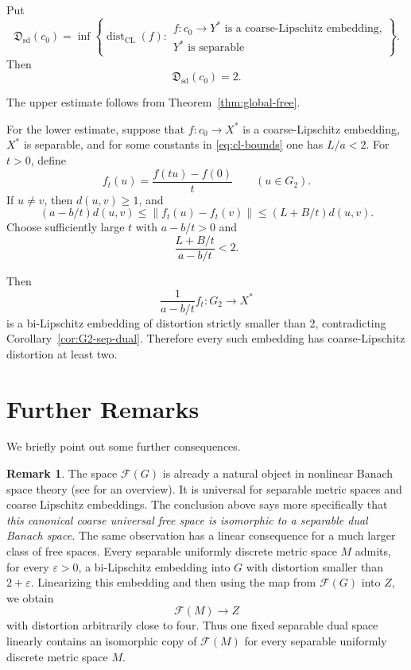 \documentclass[11pt]{amsart}
\theoremstyle{definition}
\newtheorem{remark}[theorem]{Remark}
\newcommand{\F}{\mathcal F}
\newcommand{\dist}{\operatorname{dist}}
\newcommand{\norm}[1]{\lVert#1\rVert}
\begin{document}
Put
$$
\mathfrak D_{\mathrm{sd}}(c_0)
=\inf\left\{\dist_{\mathrm{CL}}(f):
\begin{array}{c}
f:c_0\to Y^*\text{ is a coarse-Lipschitz embedding,}\\
Y^*\text{ is separable}
\end{array}
\right\}.
$$
Then
$$
       \mathfrak D_{\mathrm{sd}}(c_0)=2.
$$

The upper estimate follows from Theorem~\ref{thm:global-free}.

For the lower estimate, suppose that $f:c_0\to X^*$ is a coarse-Lipschitz
embedding, $X^*$ is separable, and for some constants in
\eqref{eq:cl-bounds} one has $L/a<2$.  For $t>0$, define
$$
       f_t(u)=\frac{f(tu)-f(0)}{t}
       \qquad(u\in G_2).
$$
If $u\neq v$, then $d(u,v)\geq1$, and
$$
 (a-b/t)d(u,v)
 \leq\norm{f_t(u)-f_t(v)}
 \leq(L+B/t)d(u,v).
$$
Choose sufficiently large $t$ with $a-b/t>0$ and
$$
       \frac{L+B/t}{a-b/t}<2.
$$

Then 
$$
\frac{1}{a-b/t}f_t:G_2\to X^*
$$
is a bi-Lipschitz embedding of distortion strictly smaller than 2, contradicting
Corollary~\ref{cor:G2-sep-dual}.  Therefore every such embedding has
coarse-Lipschitz distortion at least two.



\section{Further Remarks} We briefly point out some further consequences.

\begin{remark}\label{cor:uniformly-discrete-free} The space $\F(G)$ is already a natural object in nonlinear Banach space theory (see \cite[Section 4.5]{BL} for an overview). It is universal for separable metric spaces and coarse Lipschitz embeddings. The conclusion above says more specifically that {\em this canonical coarse universal free space is isomorphic to a separable dual Banach space.} The same observation has a linear consequence for a much larger class of free spaces. Every separable uniformly discrete metric space $M$ admits, for every $\varepsilon>0$, a bi-Lipschitz embedding into $G$ with distortion smaller than $2+\varepsilon$. Linearizing this embedding and then using the map from $\F(G)$ into $Z$, we obtain \[ \F(M)\longrightarrow Z \] with distortion arbitrarily close to four. Thus one fixed separable dual space linearly contains an isomorphic copy of $\F(M)$ for every separable uniformly discrete metric space $M$. 
\end{remark}
\end{document}
